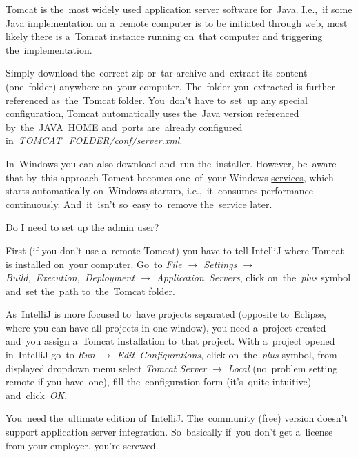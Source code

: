 \label{tomcat}
Tomcat is the~most widely used \hyperref[applicationserver]{application server} software for~Java. I.e.,~if some Java implementation on a~remote computer is to be initiated through \hyperref[internetweb]{web}, most likely there is a~Tomcat instance running on~that computer and triggering the~implementation.

Simply download the~correct zip or~tar archive and~extract its content (one~folder) anywhere on~your computer. The~folder you~extracted is further referenced as~the~Tomcat folder. You~don't have to~set~up any special configuration, Tomcat automatically uses the~Java version referenced by~the~JAVA~HOME and~ports are~already configured in~\textit{TOMCAT\_FOLDER/conf/server.xml}.

\warning In~Windows you can also download and~run the~installer. However, be~aware that by~this approach Tomcat becomes one~of~your Windows \hyperref[applicationprocessprogramservicethread]{services}, which starts automatically on~Windows startup, i.e.,~it~consumes performance continuously. And~it~isn't so~easy to~remove the~service later.

\todo Do I need to set up the admin user?

First (if you don't use a~remote Tomcat) you have to tell IntelliJ where Tomcat is installed on~your computer. Go~to \textit{File $\rightarrow$ Settings $\rightarrow$ Build,~Execution,~Deployment $\rightarrow$ Application~Servers}, click on~the~\textit{plus} symbol and~set the~path to~the~Tomcat folder.

As~IntelliJ is more focused to~have projects separated (opposite to~Eclipse, where you can have all projects in one window), you need a~project created and~you assign a~Tomcat installation to~that project. With a~project opened in~IntelliJ go~to \textit{Run $\rightarrow$ Edit~Configurations}, click on~the~\textit{plus} symbol, from displayed dropdown menu select \textit{Tomcat Server} $\rightarrow$ \textit{Local} (no~problem setting remote if you have~one), fill the~configuration form (it's~quite intuitive) and~click~\textit{OK}.

\warning You~need the~ultimate edition of~IntelliJ. The~community (free) version doesn't support application server integration. So~basically if~you don't get a~license from your employer, you're screwed.




